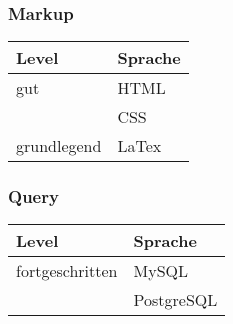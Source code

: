 \documentclass{article}
\begin{document}
\begin{multicols}{2}
\subsubsection{Markup}
\begin{tabular}{| m{6em} | m{12em} |}
    \hline
    \textbf{Level} &  \textbf{Sprache} \\
    \hline
    gut & HTML \\
    & CSS \\
    \hline
    grundlegend &  LaTex \\
    \hline
\end{tabular}
\subsubsection{Query}
\begin{tabular}{| m{6em} | m{12em} |}
    \hline
    \textbf{Level} &  \textbf{Sprache} \\
    \hline
    fortgeschritten & MySQL\\
    & PostgreSQL\\
    \hline
\end{tabular}
\end{multicols}
\end{document}
